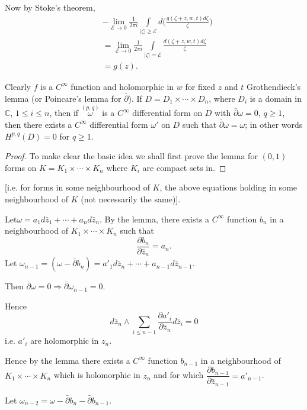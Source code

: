 Now by Stoke's theorem, 
\begin{align*}
  & -   \lim_{\mathcal{E} \to 0} \frac{1}{ 2 \pi i } \int\limits_{|
    \zeta | \geq \mathcal{E}}d \bigg( \frac{  g (\zeta + z, w, t) d
    \zeta  } {\zeta } \bigg)\\ 
  & = \lim_{\mathcal{E} \to 0} \frac{1}{2 \pi i } \int\limits_{|
    \zeta | = \mathcal{E}} \frac{d  (\zeta + z, w, t) d \zeta  }
  {\zeta }\\ 
  & = g(z).
\end{align*}

Clearly $f$ is a $C^\infty$ function and holomorphic in $w$ for fixed
$z$ and $t$ Grothendieck's lemma (or Poincare's lemma for
  $\bar{\partial}$). If $D = D_1 \times \cdots \times D_n$, where
  $D_i$ is a domain in $\mathbb{C}$, $1 \leq i \leq n$, then if
  $\overset{(p, q)}\omega$ is a $C^\infty$ differential form on $D$
  with $\bar{\partial} \omega = 0$, $q \geq 1$, then there exists a
  $C^\infty$ differential form $\omega'$ on $D$ such that
  $\bar{\partial}\omega = \omega$; in other words $H^{p, q}(D) = 0$
  for $q \geq 1$. 
\begin{proof}

To make clear the basic idea we shall first prove the lemma for $(0,
1)$ forms on $K = K_1 \times \cdots \times K_n$ where $K_i$ are
compact sets in. 
\end{proof}

[i.e. for forms in some neighbourhood of $K$, the above equations
  holding in some neighbourhood of $K$ (not necessarily the same)]. 

Let\pageoriginale $\omega = a_1 d \bar{z}_1 + \cdots + a_n d\bar{z}_n$. By the
lemma, there exists a $C^\infty$ function $b_n$ in a neighbourhood of
$K_1 \times \cdots \times K_n$ such that  
$$
\frac{\partial b_n}{\partial \bar{z}_n} = a_n.
$$
Let $\omega_{n-1} = (\omega - \bar{\partial}b_n )= a'_1d \bar{z}_n +
\cdots + a_{n-1} d\bar{z}_{n-1}$. 

Then $\bar{\partial} \omega = 0 \Rightarrow \bar{\partial} \omega_{n-1} = 0$.

Hence
$$
d \bar{z}_n \wedge \sum_{i \leq n-1} \frac{\partial a'_i}{\partial
  \bar{z}_n} d \bar{z}_i = 0 
$$
i.e. $a'_i$ are holomorphic in $z_n$.

Hence by the lemma there exists a $C^\infty$ function $b_{n-1}$ in a
neighbourhood of $K_1 \times \cdots \times K_n$ which is holomorphic
in $z_n$ and for which $\dfrac{\partial b_{n-1}}{\partial
  \bar{z}_{n-1}} = a'_{n-1}$. 

Let $\omega_{n-2} = \omega - \bar{\partial} b_n - \bar{\partial}b_{n-1}$.

